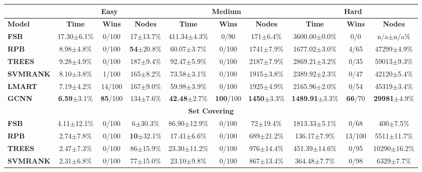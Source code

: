 \begin{table*}[htb!]
    \centering
    \begin{footnotesize}
    \begin{tabular}{|l c c c c c c c c c|}
        \hline
        \textbf{} & \multicolumn{3}{c}{\textbf{Easy}} & \multicolumn{3}{c}{\textbf{Medium}} & \multicolumn{3}{c|}{\textbf{Hard}}\\
        \hline
        \textbf{Model} & \textbf{Time} & \textbf{Wins} & \textbf{Nodes} & \textbf{Time} & \textbf{Wins} & \textbf{Nodes} & \textbf{Time} & \textbf{Wins} & \textbf{Nodes} \\
        \hline
        \textbf{FSB} & 17.30$\pm$6.1\% & 0/100 & 17$\pm$13.7\% & 411.34$\pm$4.3\% & 0/90 & 171$\pm$6.4\% & 3600.00$\pm$0.0\% & 0/0 & n/a$\pm$n/a\%\\
        \textbf{RPB} & 8.98$\pm$4.8\% & 0/100 & \textbf{54}$\pm$20.8\% & 60.07$\pm$3.7\% & 0/100 & 1741$\pm$7.9\% & 1677.02$\pm$3.0\% & 4/65 & 47299$\pm$4.9\%\\
        \textbf{TREES} & 9.28$\pm$4.9\% & 0/100 & 187$\pm$9.4\% & 92.47$\pm$5.9\% & 0/100 & 2187$\pm$7.9\% & 2869.21$\pm$3.2\% & 0/35 & 59013$\pm$9.3\%\\
        \textbf{SVMRANK} & 8.10$\pm$3.8\% & 1/100 & 165$\pm$8.2\% & 73.58$\pm$3.1\% & 0/100 & 1915$\pm$3.8\% & 2389.92$\pm$2.3\% & 0/47 & 42120$\pm$5.4\%\\
        \textbf{LMART} & 7.19$\pm$4.2\% & 14/100 & 167$\pm$9.0\% & 59.98$\pm$3.9\% & 0/100 & 1925$\pm$4.9\% & 2165.96$\pm$2.0\% & 0/54 & 45319$\pm$3.4\%\\
        \textbf{GCNN} & \textbf{6.59}$\pm$3.1\% & \textbf{85}/100 & 134$\pm$7.6\% & \textbf{42.48}$\pm$2.7\% & \textbf{100}/100 & \textbf{1450}$\pm$3.3\% & \textbf{1489.91}$\pm$3.3\% & \textbf{66}/70 & \textbf{29981}$\pm$4.9\%\\
        \multicolumn{10}{|c|}{\textbf{Set Covering}}\\
        \hline
        \textbf{FSB} & 4.11$\pm$12.1\% & 0/100 & 6$\pm$30.3\% & 86.90$\pm$12.9\% & 0/100 & 72$\pm$19.4\% & 1813.33$\pm$5.1\% & 0/68 & 400$\pm$7.5\%\\
        \textbf{RPB} & 2.74$\pm$7.8\% & 0/100 & \textbf{10}$\pm$32.1\% & 17.41$\pm$6.6\% & 0/100 & 689$\pm$21.2\% & 136.17$\pm$7.9\% & 13/100 & 5511$\pm$11.7\%\\
        \textbf{TREES} & 2.47$\pm$7.3\% & 0/100 & 86$\pm$15.9\% & 23.30$\pm$11.2\% & 0/100 & 976$\pm$14.4\% & 451.39$\pm$14.6\% & 0/95 & 10290$\pm$16.2\%\\
        \textbf{SVMRANK} & 2.31$\pm$6.8\% & 0/100 & 77$\pm$15.0\% & 23.10$\pm$9.8\% & 0/100 & 867$\pm$13.4\% & 364.48$\pm$7.7\% & 0/98 & 6329$\pm$7.7\%\\

\end{tabular}
\end{footnotesize}
\end{table*}
